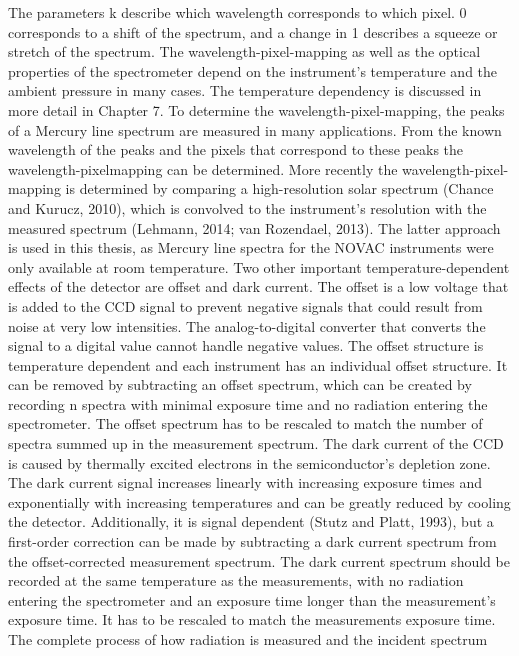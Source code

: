 \documentclass  [
  paper    = a4,
  BCOR     = 10mm,
  twoside,
  fontsize = 12pt,
  fleqn,
  toc      = bibnumbered,
  toc      = listofnumbered,
  numbers  = noendperiod,
  headings = normal,
  listof   = leveldown,
  version  = 3.03
]                                       {scrreprt}
\begin{document}
	The parameters 
k describe which wavelength corresponds to which pixel. 
0
	corresponds to a shift of the spectrum, and a change in 
1 describes a squeeze or
	stretch of the spectrum. The wavelength-pixel-mapping as well as the optical
	properties of the spectrometer depend on the instrument’s temperature and the
	ambient pressure in many cases. The temperature dependency is discussed in
	more detail in Chapter 7.
	To determine the wavelength-pixel-mapping, the peaks of a Mercury line
	spectrum are measured in many applications. From the known wavelength of
	the peaks and the pixels that correspond to these peaks the wavelength-pixelmapping
	can be determined. More recently the wavelength-pixel-mapping is
	determined by comparing a high-resolution solar spectrum (Chance and Kurucz,
	2010), which is convolved to the instrument’s resolution with the measured
	spectrum (Lehmann, 2014; van Rozendael, 2013). The latter approach is used
	in this thesis, as Mercury line spectra for the NOVAC instruments were only
	available at room temperature.
	Two other important temperature-dependent effects of the detector are offset
	and dark current. The offset is a low voltage that is added to the CCD signal
	to prevent negative signals that could result from noise at very low intensities.
	The analog-to-digital converter that converts the signal to a digital value cannot
	handle negative values. The offset structure is temperature dependent and each
	instrument has an individual offset structure. It can be removed by subtracting
	an offset spectrum, which can be created by recording n spectra with minimal
	exposure time and no radiation entering the spectrometer. The offset spectrum
	has to be rescaled to match the number of spectra summed up in the measurement
	spectrum.
	The dark current of the CCD is caused by thermally excited electrons in the semiconductor’s depletion zone. The dark current signal increases linearly with
	increasing exposure times and exponentially with increasing temperatures and can
	be greatly reduced by cooling the detector. Additionally, it is signal dependent
	(Stutz and Platt, 1993), but a first-order correction can be made by subtracting
	a dark current spectrum from the offset-corrected measurement spectrum. The
	dark current spectrum should be recorded at the same temperature as the
	measurements, with no radiation entering the spectrometer and an exposure
	time longer than the measurement’s exposure time. It has to be rescaled to
	match the measurements exposure time.
	The complete process of how radiation is measured and the incident spectrum
\end{document}
